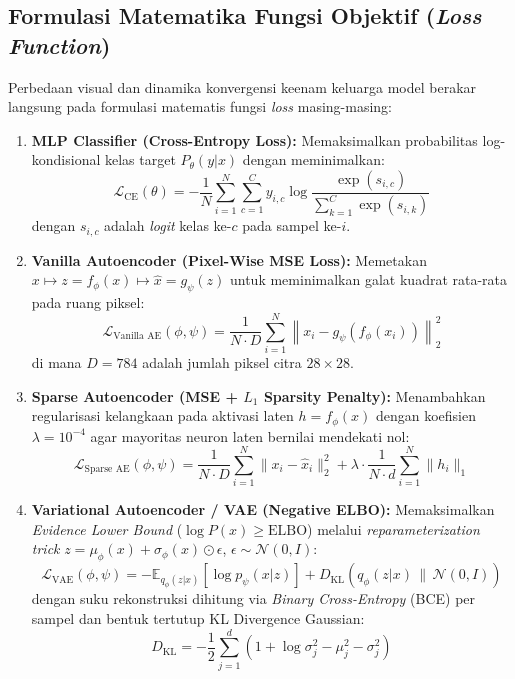 \documentclass[11pt,a4paper]{article}
\begin{document}
\subsection{Formulasi Matematika Fungsi Objektif (\textit{Loss Function})}
Perbedaan visual dan dinamika konvergensi keenam keluarga model berakar langsung pada formulasi matematis fungsi \textit{loss} masing-masing:

\begin{enumerate}[leftmargin=1.4em, itemsep=3pt]
  \item \textbf{MLP Classifier (Cross-Entropy Loss):} Memaksimalkan probabilitas log-kondisional kelas target $P_\theta(y|x)$ dengan meminimalkan:
  \begin{equation}
    \mathcal{L}_{\text{CE}}(\theta) = -\frac{1}{N}\sum_{i=1}^{N}\sum_{c=1}^{C} y_{i,c} \log \frac{\exp(s_{i,c})}{\sum_{k=1}^{C} \exp(s_{i,k})}
  \end{equation}
  dengan $s_{i,c}$ adalah \textit{logit} kelas ke-$c$ pada sampel ke-$i$.

  \item \textbf{Vanilla Autoencoder (Pixel-Wise MSE Loss):} Memetakan $x \mapsto z = f_\phi(x) \mapsto \hat{x} = g_\psi(z)$ untuk meminimalkan galat kuadrat rata-rata pada ruang piksel:
  \begin{equation}
    \mathcal{L}_{\text{Vanilla AE}}(\phi, \psi) = \frac{1}{N \cdot D}\sum_{i=1}^{N} \left\| x_i - g_\psi(f_\phi(x_i)) \right\|_2^2
  \end{equation}
  di mana $D = 784$ adalah jumlah piksel citra $28 \times 28$.

  \item \textbf{Sparse Autoencoder (MSE + $L_1$ Sparsity Penalty):} Menambahkan regularisasi kelangkaan pada aktivasi laten $h = f_\phi(x)$ dengan koefisien $\lambda = 10^{-4}$ agar mayoritas neuron laten bernilai mendekati nol:
  \begin{equation}
    \mathcal{L}_{\text{Sparse AE}}(\phi, \psi) = \frac{1}{N \cdot D}\sum_{i=1}^{N} \| x_i - \hat{x}_i \|_2^2 + \lambda \cdot \frac{1}{N \cdot d}\sum_{i=1}^{N} \| h_i \|_1
  \end{equation}

  \item \textbf{Variational Autoencoder / VAE (Negative ELBO):} Memaksimalkan \textit{Evidence Lower Bound} ($\log P(x) \ge \text{ELBO}$) melalui \textit{reparameterization trick} $z = \mu_\phi(x) + \sigma_\phi(x) \odot \epsilon$, $\epsilon \sim \mathcal{N}(0, I)$:
  \begin{equation}
    \mathcal{L}_{\text{VAE}}(\phi, \psi) = -\mathbb{E}_{q_\phi(z|x)}\!\left[\log p_\psi(x|z)\right] + D_{\text{KL}}\!\left(q_\phi(z|x) \,\|\, \mathcal{N}(0, I)\right)
  \end{equation}
  dengan suku rekonstruksi dihitung via \textit{Binary Cross-Entropy} (BCE) per sampel dan bentuk tertutup KL Divergence Gaussian:
  \begin{equation}
    D_{\text{KL}} = -\frac{1}{2}\sum_{j=1}^{d}\left(1 + \log\sigma_j^2 - \mu_j^2 - \sigma_j^2\right)
  \end{equation}


\end{enumerate}
\end{document}
